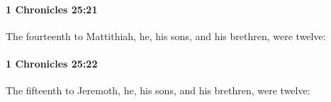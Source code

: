 		\paragraph{1 Chronicles 25:21} %
			\label{1CHRONICLES-25-21}

			The fourteenth to Mattithiah, he, his sons, and his brethren, were twelve:


		\paragraph{1 Chronicles 25:22} %
			\label{1CHRONICLES-25-22}

			The fifteenth to Jeremoth, he, his sons, and his brethren, were twelve:


